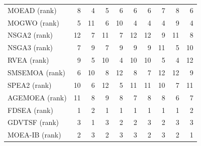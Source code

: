 \begin{table}[t]
{\begin{tabular}{l r r r r r r r r r}
MOEAD (rank)        & 8 & 4 & 5 & 6 & 6 & 6 & 7 & 8 & 6 \\
MOGWO (rank)        & 5 & 11 & 6 & 10 & 4 & 4 & 4 & 9 & 4 \\
NSGA2 (rank)        & 12 & 7 & 11 & 7 & 12 & 12 & 9 & 11 & 8 \\
NSGA3 (rank)       & 7 & 9 & 7 & 9 & 9 & 9 & 11 & 5 & 10 \\
RVEA (rank)         & 9 & 5 & 10 & 4 & 10 & 10 & 5 & 4 & 12 \\
SMSEMOA (rank)      & 6 & 10 & 8 & 12 & 8 & 7 & 12 & 12 & 9 \\
SPEA2 (rank)        & 10 & 6 & 12 & 5 & 11 & 11 & 10 & 7 & 11 \\
AGEMOEA (rank)      & 11 & 8 & 9 & 8 & 7 & 8 & 8 & 6 & 7 \\
FDSEA (rank)        & 1 & 2 & 1 & 1 & 1 & 1 & 1 & 1 & 2 \\
GDVTSF (rank)       & 3 & 1 & 3 & 2 & 2 & 3 & 2 & 3 & 3 \\
MOEA-IB (rank)      & 2 & 3 & 2 & 3 & 3 & 2 & 3 & 2 & 1 \\
\bottomrule
\end{tabular}
}
\end{table}
